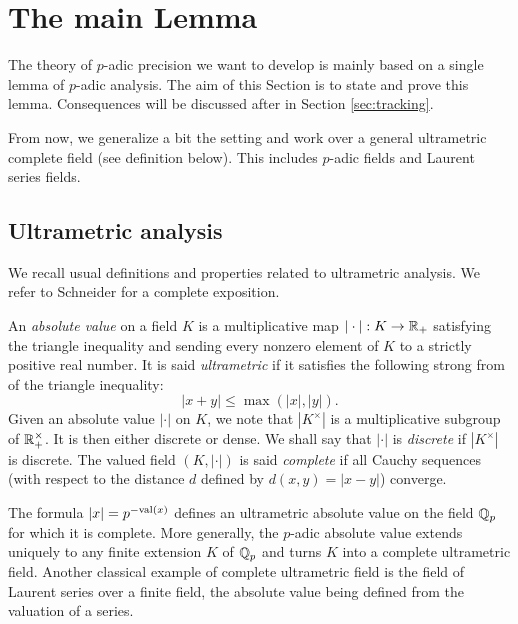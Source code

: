 \documentclass{lms}
\begin{document}

\section{The main Lemma}
\label{sec:mainlemma}

The theory of $p$-adic precision we want to develop is mainly based 
on a single lemma of $p$-adic analysis. The aim of this Section is
to state and prove this lemma. Consequences will be discussed after
in Section \ref{sec:tracking}.

From now, we generalize a bit the setting and work over a general 
ultrametric complete field (see definition below). This includes 
$p$-adic fields and Laurent series fields.

\subsection{Ultrametric analysis}
\label{ssec:ultrametric}

We recall usual definitions and properties related to ultrametric 
analysis. We refer to Schneider \cite{Schneider} for a complete 
exposition.

An \emph{absolute value} on a field $K$ is a multiplicative map $|\cdot| 
: K \to \mathbb R_+$ satisfying the triangle inequality and sending every 
nonzero element of $K$ to a strictly positive real number. It is said 
\emph{ultrametric} if it satisfies the following strong from of the 
triangle inequality:
$$|x+y| \leq \max(|x|, |y|).$$
Given an absolute value $|\cdot|$ on $K$, we note that $|K^\times|$ is a 
multiplicative subgroup of $\mathbb R_+^\times$. It is then either discrete or 
dense. We shall say that $|\cdot|$ is \emph{discrete} if $|K^\times|$ is
discrete. The valued field $(K, |\cdot|)$ is said \emph{complete} if all 
Cauchy sequences (with respect to the distance $d$ defined by $d(x,y) = 
|x-y|$) converge.

The formula $|x| = p^{-\text{\rm val}(x)}$ defines an ultrametric absolute value on 
the field $\mathbb Q_p$ for which it is complete. More generally, the $p$-adic 
absolute value extends uniquely to any finite extension $K$ of $\mathbb Q_p$ and 
turns $K$ into a complete ultrametric field. Another classical example of 
complete ultrametric field is the field of Laurent series over a finite
field, the absolute value being defined from the valuation of a series.
\end{document}
